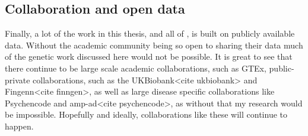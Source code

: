 \subsection{Collaboration and open data}
Finally, a lot of the work in this thesis, and all of , is built on publicly available data. Without the academic community being so open to sharing their data much of the genetic work discussed here would not be possible. It is great to see that there continue to be large scale academic collaborations, such as GTEx, public-private collaborations, such as the UKBiobank<cite ukbiobank> and Fingenn<cite finngen>, as well as large disease specific collaborations like Psychencode and amp-ad<cite psychencode>, as without that my research would be impossible. Hopefully and ideally, collaborations like these will continue to happen.




